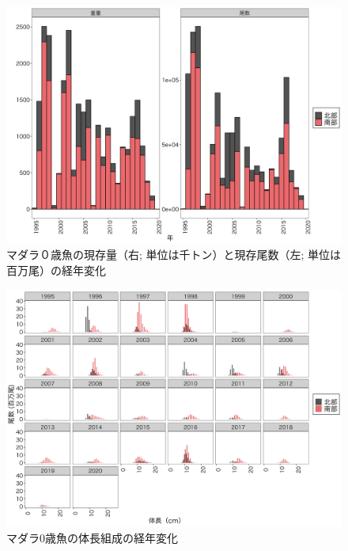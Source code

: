 \documentclass[11pt]{article} %
\begin{document}
\begin{linenumbers}
\begin{figure}[h]
  \centering
  \includegraphics[width = 14cm]{マダラ０＋trend.png}
  \caption{マダラ０歳魚の現存量（右; 単位は千トン）と現存尾数（左; 単位は百万尾）の経年変化}
\end{figure}

\begin{figure}[h]
  \centering
  \includegraphics[width = 14cm]{マダラ0+length.png}
  \caption{マダラ0歳魚の体長組成の経年変化}
\end{figure}


\end{linenumbers}
\end{document}
